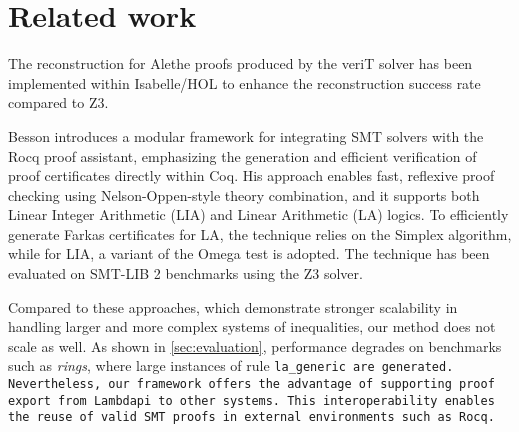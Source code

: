 \documentclass[runningheads,envcountsame]{llncs}
\begin{document}










\section{Related work}
\label{sec:related}

The reconstruction for Alethe proofs produced by the veriT solver has been implemented within Isabelle/HOL \cite{aletheInIsa} to enhance the reconstruction success rate compared to Z3.

Besson \cite{micromega} introduces a modular framework for integrating SMT solvers with the Rocq proof assistant, emphasizing the generation and efficient verification of proof certificates directly within Coq.
His approach enables fast, reflexive proof checking using Nelson-Oppen-style theory combination, and it supports both Linear Integer Arithmetic (LIA) and Linear Arithmetic (LA) logics.
To efficiently generate Farkas certificates for LA, the technique relies on the Simplex algorithm, while for LIA, a variant of the Omega test \cite{omegatest} is adopted.
The technique has been evaluated on SMT-LIB 2 benchmarks using the Z3 solver.

Compared to these approaches, which demonstrate stronger scalability in handling larger and more complex systems of inequalities, our method does not  scale as well.
As shown in \cref{sec:evaluation}, performance degrades on benchmarks such as \emph{rings}, where large instances of rule \tt{la\_generic} are generated.
Nevertheless, our framework offers the advantage of supporting proof export from Lambdapi to other systems. This interoperability enables the reuse of valid SMT proofs in external environments such as Rocq.
\end{document}
